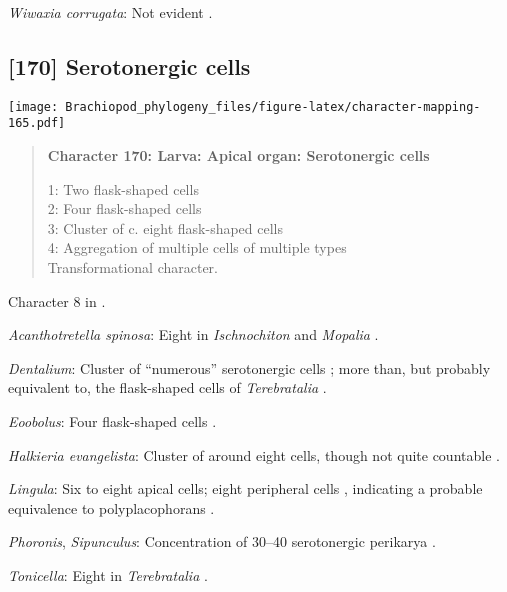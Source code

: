 \documentclass[openany]{book}
\theoremstyle{definition}
\theoremstyle{definition}
\theoremstyle{definition}
\theoremstyle{remark}
\begin{document}
\hypertarget{Wiwaxia_corrugata-coding-169}{}
\emph{Wiwaxia corrugata}: Not evident \citep[fig. 2C]{Santagata2004}.

\subsection*{{[}170{]} Serotonergic cells}\label{serotonergic-cells}

\texttt{[image: Brachiopod\_phylogeny\_files/figure-latex/character-mapping-165.pdf]}

\begin{quote}
\textbf{Character 170: Larva: Apical organ: Serotonergic cells}

1: Two flask-shaped cells\\
2: Four flask-shaped cells\\
3: Cluster of c. eight flask-shaped cells\\
4: Aggregation of multiple cells of multiple types\\
Transformational character.
\end{quote}

Character 8 in \citet{Haszprunar2008}.

\hypertarget{Acanthotretella_spinosa-coding-170}{}
\emph{Acanthotretella spinosa}: Eight in \emph{Ischnochiton} and
\emph{Mopalia} \citep{Wanninger2007}.

\hypertarget{Dentalium-coding-170}{}
\emph{Dentalium}: Cluster of ``numerous'' serotonergic cells
\citep{HaySchmidt1992, Altenburger2010}; more than, but probably
equivalent to, the flask-shaped cells of \emph{Terebratalia}
\citep{Luter2016}.

\hypertarget{Eoobolus-coding-170}{}
\emph{Eoobolus}: Four flask-shaped cells \citep{Altenburger2010}.

\hypertarget{Halkieria_evangelista-coding-170}{}
\emph{Halkieria evangelista}: Cluster of around eight cells, though not
quite countable \citep{Wanninger2005}.

\hypertarget{Lingula-coding-170}{}
\emph{Lingula}: Six to eight apical cells; eight peripheral cells
\citep{Wanninger2007}, indicating a probable equivalence to
polyplacophorans \citep{Haszprunar2008}.

\hypertarget{Phoronis-coding-170}{}
\emph{Phoronis}, \emph{Sipunculus}: Concentration of 30--40 serotonergic
perikarya \citep[in \emph{Fredericella};][]{Gruhl2010F}.

\hypertarget{Tonicella-coding-170}{}
\emph{Tonicella}: Eight in \emph{Terebratalia} \citep{Luter2016}.
\end{document}

